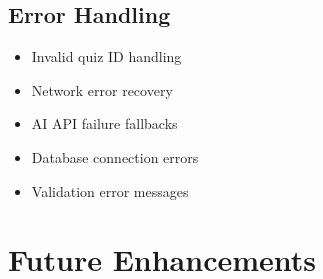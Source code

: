 \documentclass[12pt,a4paper]{article}
\begin{document}
\subsection{Error Handling}
\begin{itemize}
    \item Invalid quiz ID handling
    \item Network error recovery
    \item AI API failure fallbacks
    \item Database connection errors
    \item Validation error messages
\end{itemize}

\newpage

\section{Future Enhancements}
\end{document}
